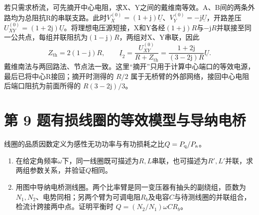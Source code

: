 \documentclass[UTF8,fontset=fandol,a4paper,11pt]{ctexart}
\begin{document}
若只需求桥流，可先摘开中心电阻，求X、Y之间的戴维南等效。A、B间的两条外路均为总阻抗R的串联支路。此时$V_X^{(0)}=(1+\mathrm j)\underline U$、$V_Y^{(0)}=-\mathrm j\underline U$，开路差压$U_{XY}^{(0)}=(1+2\mathrm j)\underline U$。将理想电压源短接，X和Y各经$(1+\mathrm j)R$与$-\mathrm jR$并联接至同一公共点，每组并联阻抗为$(1-\mathrm j)R$，两组对X、Y串联，因此
\[
Z_{\mathrm{th}}=2(1-\mathrm j)R,\qquad
\underline I_2=\frac{U_{XY}^{(0)}}{R+Z_{\mathrm{th}}}
=\frac{1+2\mathrm j}{(3-2\mathrm j)R}\underline U.
\]
戴维南法与两回路法、节点法一致。这里“摘开”只用于计算中心端口的等效电源，最后已将中心R接回；摘开时测得的 $R/2$ 属于无桥臂的外部网络，接回中心电阻后端口阻抗为前面所得的 $R(3-2\mathrm j)/3$。




\section*{第 9 题\quad 有损线圈的等效模型与导纳电桥}\label{q:9}


线圈的品质因数定义为感性无功功率与有功损耗之比$Q=P_{\rm q}/P_{\rm a}$。
\begin{enumerate}
\item 在给定角频率$\omega$下，同一线圈既可描述为$R,L$串联，也可描述为$R',L'$并联，求两组参数关系，并验证$Q$相同。
\item 用图中导纳电桥测线圈。两个比率臂是同一变压器有抽头的副绕组，匝数为$N_1,N_2$、电势同相；另两个臂为可调电阻$R_b$及电容$C$与待测线圈的并联组合，检流计跨接两中点。证明平衡时
$Q=(N_2/N_1)\omega C R_b$。
\end{enumerate}
\end{document}
